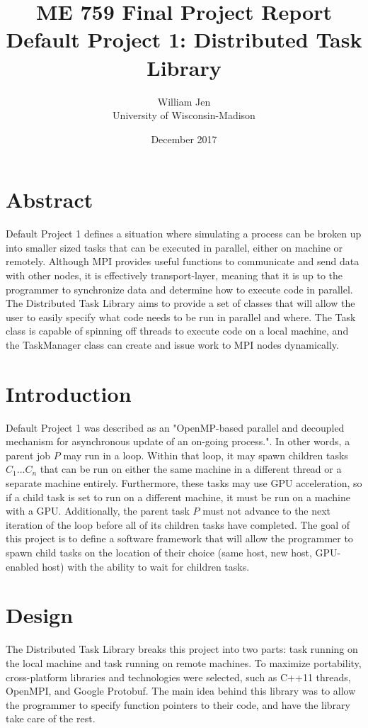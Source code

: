 \documentclass[11pt]{article}
\title{\vspace{10em}ME 759 Final Project Report \\ Default Project 1: Distributed Task Library}
\author{William Jen \\ University of Wisconsin-Madison}
\date{December 2017}
\begin{document}
    \maketitle

    \pagebreak
    
    \section{Abstract}
        Default Project 1 defines a situation where simulating a process can be broken up into smaller sized
        tasks that can be executed in parallel, either on machine or remotely. Although MPI provides useful 
        functions to communicate and send data with other nodes, it is effectively transport-layer, meaning
        that it is up to the programmer to synchronize data and determine how to execute code in parallel.
        The Distributed Task Library aims to provide a set of classes that will allow the user to easily
        specify what code needs to be run in parallel and where. The Task class is capable of spinning off
        threads to execute code on a local machine, and the TaskManager class can create and issue work
        to MPI nodes dynamically.
        
    \tableofcontents
    \pagebreak
    
    \section{Introduction}
        Default Project 1 was described as an "OpenMP-based parallel and decoupled mechanism for
        asynchronous update of an on-going process.". In other words, a parent job $P$ may run in 
        a loop. Within that loop, it may spawn children tasks $C_1 \ldots C_n$ that can be run on either
        the same machine in a different thread or a separate machine entirely. Furthermore, these tasks may
        use GPU acceleration, so if a child task is set to run on a different machine, it must be run on a 
        machine with a GPU. Additionally, the parent task $P$ must not advance to the next iteration of the loop
        before all of its children tasks have completed. The goal of this project is to define a software framework 
        that will allow the programmer to spawn child tasks on the location of their choice (same host, new host, 
        GPU-enabled host) with the ability to wait for children tasks.
    
    \section{Design}
        The Distributed Task Library breaks this project into two parts: task running on the local machine and 
        task running on remote machines. To maximize portability, cross-platform libraries and technologies 
        were selected, such as C++11 threads, OpenMPI, and Google Protobuf. The main idea behind this library
        was to allow the programmer to specify function pointers to their code, and have the library take care of
        the rest. 
\end{document}
